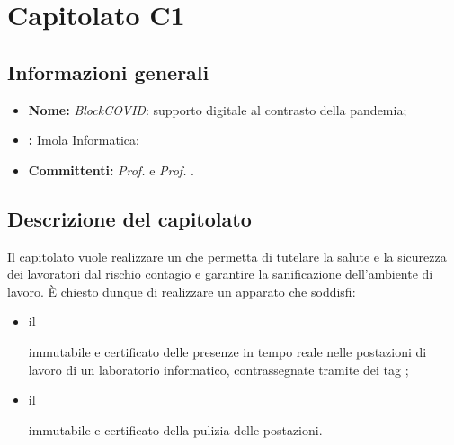 \section{Capitolato C1}

\subsection{Informazioni generali}
\begin{itemize}
\item \textbf{Nome:} \textit{BlockCOVID}: supporto digitale al contrasto della pandemia;
\item \textbf{:} Imola Informatica;
\item \textbf{Committenti:} \textit{Prof. \Tullio{}} e \textit{Prof. \Riccardo{}}.
\end{itemize}

\subsection{Descrizione del capitolato}
Il capitolato vuole realizzare un  che permetta di tutelare la salute e la sicurezza dei lavoratori dal rischio contagio e garantire la sanificazione dell'ambiente di lavoro. È chiesto dunque di realizzare un apparato che soddisfi:
\begin{itemize}
\item il  immutabile e certificato delle presenze in tempo reale nelle postazioni di lavoro di un laboratorio informatico, contrassegnate tramite dei tag ;
\item il  immutabile e certificato della pulizia delle postazioni.
\end{itemize}
